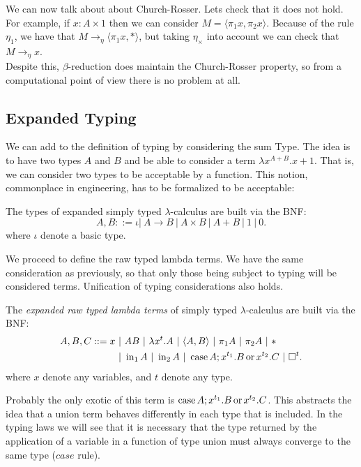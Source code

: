 We can now talk about about Church-Rosser.  Lets check that it does not hold. For example, if $x: A\times 1$ then we can consider $M=\langle \pi_1x, \pi_2x\rangle$. Because of the rule $\eta_1$, we have that $M \to_{\eta}\langle \pi_1 x, *\rangle$, but taking $\eta_\times$ into account we can check that $M \to_{\eta} x$. \\

Despite this, $\beta$-reduction does maintain the Church-Rosser property, so from a computational point of view there is no problem at all.

\subsection{Expanded Typing}

We can add to the definition of typing by considering the sum Type. The idea is to have two types $A$ and $B$ and be able to consider a term $\lambda x^{A+B}. x+1$. That is, we can consider two types to be acceptable by a function. This notion, commonplace in engineering, has to be formalized to be acceptable:

\begin{definition}
  The types of expanded simply typed $\lambda$-calculus are built via the BNF:
  $$A,B ::= \iota |\ A\to B\ |\ A \times B \ |\ A + B  \ |\ 1\ |\ 0.$$
  where $\iota$ denote a basic type. 
\end{definition}

We proceed to define the raw typed lambda terms. We have the same consideration as previously, so that only those being subject to typing will be considered terms. Unification of typing considerations also holds.
\begin{definition}
  The \emph{expanded raw typed lambda terms} of simply typed $\lambda$-calculus are built via the BNF:
  \begin{align*}
    A,B, C ::= x\ &|\ AB\ |\ \lambda x^t.A \ |\ \langle A,B \rangle\ |\ \pi_1A\ |\ \pi_2A\ |\ * \\
               &|\ \iin_1 A\ |\ \iin_2 A \ |\ \ccase A ; x^{t_1}.B\oo x^{t_2}.C \ |\ \square^t. 
  \end{align*}
  where $x$ denote any variables, and $t$ denote any type. 
\end{definition}

Probably the only exotic of this term is $\operatorname{case} A ; x^{t_1}.B\operatorname{ or } x^{t_2}.C$. This abstracts the idea that a union term behaves differently in each type that is included. In the typing laws we will see that it is necessary that the type returned by the application of a variable in a function of type union must always converge to the same type ($case$ rule).\\

